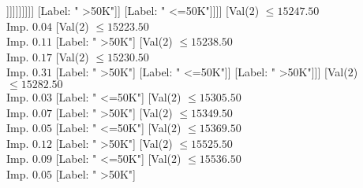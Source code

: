\documentclass[margin=10pt]{standalone}
\begin{document}
\begin{forest}
																																																[Val($2$) $ \leq 14938.50$ \\ Imp. $0.26$
																																																	[Label: " >50K"]
																																																	[Val($2$) $ \leq 15008.50$ \\ Imp. $0.14$
																																																		[Label: " <=50K"]
																																																		[Val($2$) $ \leq 15015.50$ \\ Imp. $0.81$
																																																			[Label: " >50K"]
																																																			[Label: " <=50K"]]]]]]]]]]
																																										[Label: " >50K"]]
																																									[Label: " <=50K"]]]]
																																						[Val($2$) $ \leq 15247.50$ \\ Imp. $0.04$
																																							[Val($2$) $ \leq 15223.50$ \\ Imp. $0.11$
																																								[Label: " >50K"]
																																								[Val($2$) $ \leq 15238.50$ \\ Imp. $0.17$
																																									[Val($2$) $ \leq 15230.50$ \\ Imp. $0.31$
																																										[Label: " >50K"]
																																										[Label: " <=50K"]]
																																									[Label: " >50K"]]]
																																							[Val($2$) $ \leq 15282.50$ \\ Imp. $0.03$
																																								[Label: " <=50K"]
																																								[Val($2$) $ \leq 15305.50$ \\ Imp. $0.07$
																																									[Label: " >50K"]
																																									[Val($2$) $ \leq 15349.50$ \\ Imp. $0.05$
																																										[Label: " <=50K"]
																																										[Val($2$) $ \leq 15369.50$ \\ Imp. $0.12$
																																											[Label: " >50K"]
																																											[Val($2$) $ \leq 15525.50$ \\ Imp. $0.09$
																																												[Label: " <=50K"]
																																												[Val($2$) $ \leq 15536.50$ \\ Imp. $0.05$
																																													[Label: " >50K"]

\end{forest}
\end{document}
